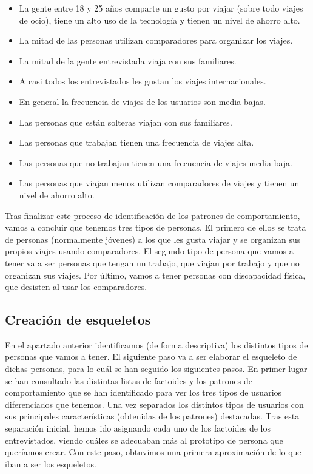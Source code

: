 \begin{itemize}
    \item La gente entre 18 y 25 años comparte un gusto por viajar (sobre todo viajes de ocio), tiene un alto uso de la tecnología y tienen un nivel de ahorro alto.
    \item La mitad de las personas utilizan comparadores para organizar los viajes.
    \item La mitad de la gente entrevistada viaja con sus familiares.
    \item A casi todos los entrevistados les gustan los viajes internacionales.
    \item En general la frecuencia de viajes de los usuarios son media-bajas.
    \item Las personas que están solteras viajan con sus familiares.
    \item Las personas que trabajan tienen una frecuencia de viajes alta.
    \item Las personas que no trabajan tienen una frecuencia de viajes media-baja.
    \item Las personas que viajan menos utilizan comparadores de viajes y tienen un nivel de ahorro alto.
    
\end{itemize}

Tras finalizar este proceso de identificación de los patrones de comportamiento, vamos a concluir que tenemos tres tipos de personas. El primero de ellos se trata de personas (normalmente jóvenes) a los que les gusta viajar y se organizan sus propios viajes usando comparadores. El segundo tipo de persona que vamos a tener va a ser personas que tengan un trabajo, que viajan por trabajo y que no organizan sus viajes. Por último, vamos a tener personas con discapacidad física, que desisten al usar los comparadores.

\subsection{Creación de esqueletos}
En el apartado anterior identificamos (de forma descriptiva) los distintos tipos de personas que vamos a tener. El siguiente paso va a ser elaborar el 
esqueleto de dichas personas, para lo cuál se han seguido los siguientes pasos. En primer lugar se han consultado las distintas listas de factoides y 
los patrones de comportamiento que se han identificado para ver los tres tipos de usuarios diferenciados que tenemos. Una vez separados los distintos tipos
de usuarios con sus principales características (obtenidas de los patrones) destacadas. Tras esta separación inicial, hemos ido asignando cada uno de los factoides
de los entrevistados, viendo cuáles se adecuaban más al prototipo de persona que queríamos crear. Con este paso, obtuvimos una primera aproximación de lo que iban
a ser los esqueletos. \\

